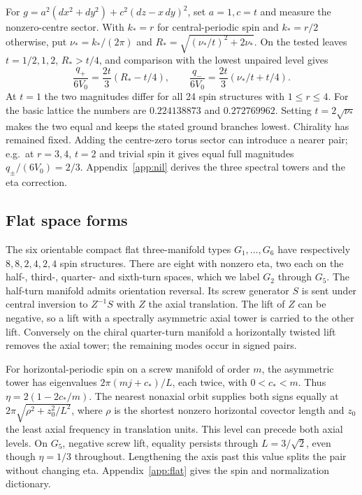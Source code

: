For \(g=a^2(dx^2+dy^2)+c^2(dz-x\,dy)^2\), set \(a=1,c=t\) and measure the nonzero-centre sector. With \(k_*=r\) for central-periodic spin and \(k_*=r/2\) otherwise, put \(\nu_*=k_*/(2\pi)\) and \(R_*=\sqrt{(\nu_*/t)^2+2\nu_*}\). On the tested leaves \(t=1/2,1,2\), \(R_*>t/4\), and comparison with the lowest unpaired level gives
\begin{equation}
 \frac{q_+}{6V_0}=\frac{2t}{3}(R_*-t/4),\qquad
 \frac{q_-}{6V_0}=\frac{2t}{3}(\nu_*/t+t/4).
 \label{eq:nilmin}
\end{equation}
At \(t=1\) the two magnitudes differ for all 24 spin structures with \(1\le r\le4\). For the basic lattice the numbers are \(0.224138873\) and \(0.272769962\). Setting \(t=2\sqrt{\nu_*}\) makes the two equal and keeps the stated ground branches lowest. Chirality has remained fixed. Adding the centre-zero torus sector can introduce a nearer pair; e.g.\ at \(r=3,4\), \(t=2\) and trivial spin it gives equal full magnitudes \(q_\pm/(6V_0)=2/3\). Appendix~\ref{app:nil} derives the three spectral towers and the eta correction.

\subsection{Flat space forms}
The six orientable compact flat three-manifold types \(G_1,\dots,G_6\) have respectively \(8,8,2,4,2,4\) spin structures. There are eight with nonzero eta, two each on the half-, third-, quarter- and sixth-turn spaces, which we label \(G_2\) through \(G_5\). The half-turn manifold admits orientation reversal. Its screw generator \(S\) is sent under central inversion to \(Z^{-1}S\) with \(Z\) the axial translation. The lift of \(Z\) can be negative, so a lift with a spectrally asymmetric axial tower is carried to the other lift. Conversely on the chiral quarter-turn manifold a horizontally twisted lift removes the axial tower; the remaining modes occur in signed pairs.

For horizontal-periodic spin on a screw manifold of order \(m\), the asymmetric tower has eigenvalues \(2\pi(mj+c_*)/L\), each twice, with \(0<c_*<m\). Thus \(\eta=2(1-2c_*/m)\). The nearest nonaxial orbit supplies both signs equally at \(2\pi\sqrt{\rho^2+z_0^2/L^2}\), where \(\rho\) is the shortest nonzero horizontal covector length and \(z_0\) the least axial frequency in translation units. This level can precede both axial levels. On \(G_5\), negative screw lift, equality persists through \(L=3/\sqrt2\), even though \(\eta=1/3\) throughout. Lengthening the axis past this value splits the pair without changing eta. Appendix~\ref{app:flat} gives the spin and normalization dictionary.

